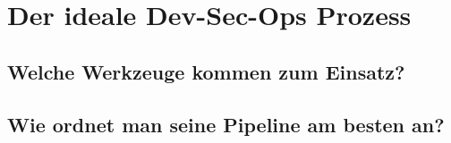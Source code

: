 \chapter{Der \glqq ideale\grqq{} Dev-Sec-Ops Prozess}

\section{Welche Werkzeuge kommen zum Einsatz?}
\section{Wie ordnet man seine Pipeline am besten an?}